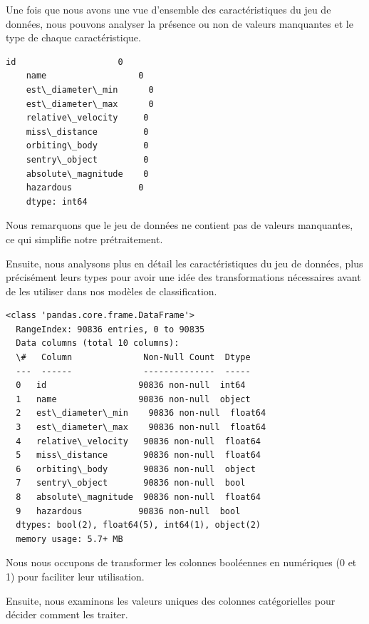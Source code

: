 \documentclass[11pt]{article}
\begin{document}
Une fois que nous avons une vue d'ensemble des caractéristiques du jeu
de données, nous pouvons analyser la présence ou non de valeurs
manquantes et le type de chaque caractéristique.

\begin{tcolorbox}[breakable, size=fbox, boxrule=.5pt, pad at break*=1mm, opacityfill=0]
  \begin{Verbatim}[commandchars=\\\{\}]
    id                    0
    name                  0
    est\_diameter\_min      0
    est\_diameter\_max      0
    relative\_velocity     0
    miss\_distance         0
    orbiting\_body         0
    sentry\_object         0
    absolute\_magnitude    0
    hazardous             0
    dtype: int64
  \end{Verbatim}
\end{tcolorbox}

Nous remarquons que le jeu de données ne contient pas de valeurs
manquantes, ce qui simplifie notre prétraitement.

Ensuite, nous analysons plus en détail les caractéristiques du jeu de
données, plus précisément leurs types pour avoir une idée des
transformations nécessaires avant de les utiliser dans nos modèles de
classification.

\begin{Verbatim}[commandchars=\\\{\}]
  <class 'pandas.core.frame.DataFrame'>
  RangeIndex: 90836 entries, 0 to 90835
  Data columns (total 10 columns):
  \#   Column              Non-Null Count  Dtype
  ---  ------              --------------  -----
  0   id                  90836 non-null  int64
  1   name                90836 non-null  object
  2   est\_diameter\_min    90836 non-null  float64
  3   est\_diameter\_max    90836 non-null  float64
  4   relative\_velocity   90836 non-null  float64
  5   miss\_distance       90836 non-null  float64
  6   orbiting\_body       90836 non-null  object
  7   sentry\_object       90836 non-null  bool
  8   absolute\_magnitude  90836 non-null  float64
  9   hazardous           90836 non-null  bool
  dtypes: bool(2), float64(5), int64(1), object(2)
  memory usage: 5.7+ MB
\end{Verbatim}

Nous nous occupons de transformer les colonnes booléennes en numériques
(0 et 1) pour faciliter leur utilisation.

Ensuite, nous examinons les valeurs uniques des colonnes catégorielles
pour décider comment les traiter.
\end{document}

